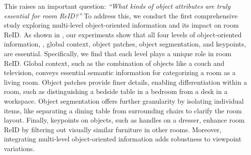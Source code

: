 This raises an important question: \textit{“What kinds of object attributes are truly essential for room ReID?”} To address this, we conduct the first comprehensive study exploring multi-level object-oriented information and its impact on room ReID.
As shown in , our experiments show that all four levels of object-oriented information, \ie, global context, object patches, object segmentation, and keypoints, are essential.
Specifically, we find that each level plays a unique role in room ReID. Global context, such as the combination of objects like a couch and television, conveys essential semantic information for categorizing a room as a living room. Object patches provide finer details, enabling differentiation within a room, such as distinguishing a bedside table in a bedroom from a desk in a workspace. Object segmentation offers further granularity by isolating individual items, like separating a dining table from surrounding chairs to clarify the room layout. Finally, keypoints on objects, such as handles on a dresser, enhance room ReID by filtering out visually similar furniture in other rooms. Moreover, integrating multi-level object-oriented information adds robustness to viewpoint variations.


